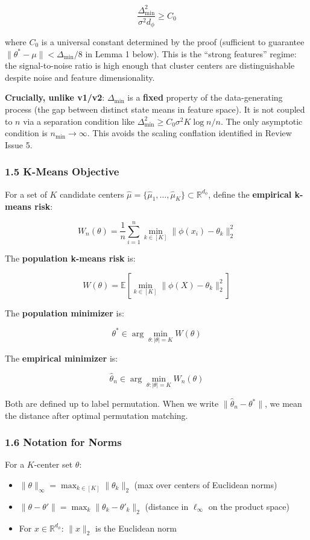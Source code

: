 \documentclass[
  12pt,
]{ctexart}
\providecommand{\tightlist}{%
  \setlength{\itemsep}{0pt}\setlength{\parskip}{0pt}}
\begin{document}
\[\frac{\Delta_{\min}^2}{\sigma^2 d_\phi} \geq C_0\]

where \(C_0\) is a universal constant determined by the proof
(sufficient to guarantee \(\|\theta^* - \mu\| < \Delta_{\min}/8\) in
Lemma 1 below). This is the ``strong features'' regime: the
signal-to-noise ratio is high enough that cluster centers are
distinguishable despite noise and feature dimensionality.

\textbf{Crucially, unlike v1/v2}: \(\Delta_{\min}\) is a \textbf{fixed}
property of the data-generating process (the gap between distinct state
means in feature space). It is not coupled to \(n\) via a separation
condition like \(\Delta_{\min}^2 \geq C_0 \sigma^2 K \log n / n\). The
only asymptotic condition is \(n_{\min} \to \infty\). This avoids the
scaling conflation identified in Review Issue 5.

\subsubsection{1.5 K-Means Objective}\label{k-means-objective}

For a set of \(K\) candidate centers
\(\hat{\mu} = \{\hat{\mu}_1, \dots, \hat{\mu}_K\} \subset \mathbb{R}^{d_\phi}\),
define the \textbf{empirical k-means risk}:

\[W_n(\theta) = \frac{1}{n} \sum_{i=1}^n \min_{k \in [K]} \|\phi(x_i) - \theta_k\|_2^2\]

The \textbf{population k-means risk} is:

\[W(\theta) = \mathbb{E}\left[\min_{k \in [K]} \|\phi(X) - \theta_k\|_2^2\right]\]

The \textbf{population minimizer} is:

\[\theta^* \in \arg \min_{\theta: |\theta| = K} W(\theta)\]

The \textbf{empirical minimizer} is:

\[\hat{\theta}_n \in \arg \min_{\theta: |\theta| = K} W_n(\theta)\]

Both are defined up to label permutation. When we write
\(\|\hat{\theta}_n - \theta^*\|\), we mean the distance after optimal
permutation matching.

\subsubsection{1.6 Notation for Norms}\label{notation-for-norms}

For a \(K\)-center set \(\theta\):

\begin{itemize}
\tightlist
\item
  \(\|\theta\|_\infty = \max_{k \in [K]} \|\theta_k\|_2\) (max over
  centers of Euclidean norms)
\item
  \(\|\theta - \theta'\| = \max_{k} \|\theta_k - \theta'_k\|_2\)
  (distance in \(\ell_\infty\) on the product space)
\item
  For \(x \in \mathbb{R}^{d_\phi}\): \(\|x\|_2\) is the Euclidean norm
\end{itemize}
\end{document}
